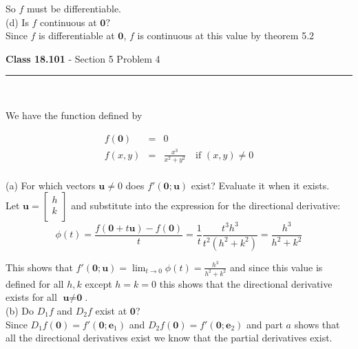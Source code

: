 \documentclass[11pt,reqno]{article}
\begin{document}
So $f$ must be differentiable.\\

\noindent (d) Is $f$ continuous at $\textbf{0}?$\\

Since $f$ is differentiable at $\textbf{0}$, $f$ is continuous at this value by theorem 5.2

\vspace{15pt}
\begin{flushleft} 
\textbf{Class 18.101} - Section 5 Problem 4\\
\rule{500pt}{1pt}\\
\end{flushleft} 


\noindent We have the function defined by

\begin{eqnarray*} 
f(\textbf{0}) &=& 0 \\
f(x,y) &=& \frac{x^3}{x^2 + y^2} \quad \text{if $(x,y) \neq 0$} \\
\end{eqnarray*}


 \noindent (a) For which vectors $\textbf{u} \neq 0$ does $f'(\textbf{0};\textbf{u})$ exist? Evaluate it when it exists.\\

\noindent Let $\textbf{u} = \left[ \begin{array}{c} h\\ k\\ \end{array} \right]$ and substitute into the expression for the directional derivative:
\[ \phi(t) = \frac{f(\textbf{0} + t \textbf{u}) - f(\textbf{0})}{t} = \frac{1}{t} \frac{t^3 h^3}{t^2 (h^2 + k^2)} = \frac{h^3}{h^2 + k^2} \]

This shows that $f'(\textbf{0}; \textbf{u}) = \lim_{t \to 0} \phi(t) = \frac{h^3}{h^2 + k^2}$ and since this value is defined for all $h,k$ except $h = k = 0$ this shows that the directional derivative exists for all $\textbf{u} \neq \textbf{0}$.\\

\noindent (b) Do $D_1 f$ and $D_2 f$ exist at $\textbf{0}$?\\

Since $D_1 f(\textbf{0}) = f'(\textbf{0}; \textbf{e}_1)$ and $D_2 f(\textbf{0}) = f'(\textbf{0}; \textbf{e}_2)$ and part $a$ shows that all the directional derivatives exist we know that the partial derivatives exist.\\
\end{document}
